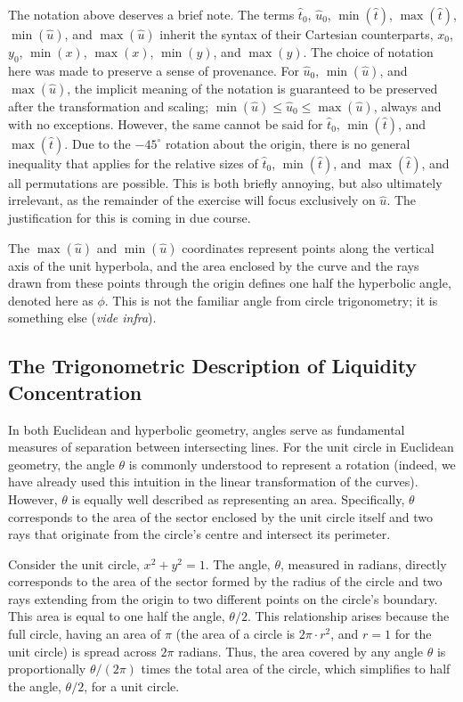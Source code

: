 \documentclass{article}
\begin{document}
The notation above deserves a brief note. The terms ${\hat{t}}_{0}$, ${\hat{u}}_{0}$, $\min(\hat{t})$, $\max(\hat{t})$, $\min(\hat{u})$, and $\max(\hat{u})$ inherit the syntax of their Cartesian counterparts, $x_{0}$, $y_{0}$, $\min(x)$, $\max(x)$, $\min(y)$, and $\max(y)$. The choice of notation here was made to preserve a sense of provenance. For ${\hat{u}}_{0}$, $\min(\hat{u})$, and $\max(\hat{u})$, the implicit meaning of the notation is guaranteed to be preserved after the transformation and scaling; $\min(\hat{u}) \leq {\hat{u}}_{0} \leq \max(\hat{u})$, always and with no exceptions. However, the same cannot be said for ${\hat{t}}_{0}$, $\min(\hat{t})$, and $\max(\hat{t})$. Due to the $-45^\circ$ rotation about the origin, there is no general inequality that applies for the relative sizes of ${\hat{t}}_{0}$, $\min(\hat{t})$, and $\max(\hat{t})$, and all permutations are possible. This is both briefly annoying, but also ultimately irrelevant, as the remainder of the exercise will focus exclusively on $\hat{u}$. The justification for this is coming in due course.

The $\max\left( \hat{u} \right)$ and $\min\left( \hat{u} \right)$ coordinates represent points along the vertical axis of the unit hyperbola, and the area enclosed by the curve and the rays drawn from these points through the origin defines one half the hyperbolic angle, denoted here as $\phi$. This is not the familiar angle from circle trigonometry; it is something else (\textit{vide infra}).

\subsection{The Trigonometric Description of Liquidity Concentration}\label{subsec5.3}

In both Euclidean and hyperbolic geometry, angles serve as fundamental measures of separation between intersecting lines. For the unit circle in Euclidean geometry, the angle $\theta$ is commonly understood to represent a rotation (indeed, we have already used this intuition in the linear transformation of the curves). However, $\theta$ is equally well described as representing an area. Specifically, $\theta$ corresponds to the area of the sector enclosed by the unit circle itself and two rays that originate from the circle's centre and intersect its perimeter.

Consider the unit circle, $x^{2} + y^{2} = 1$. The angle, $\theta$, measured in radians, directly corresponds to the area of the sector formed by the radius of the circle and two rays extending from the origin to two different points on the circle's boundary. This area is equal to one half the angle, $\theta / 2$. This relationship arises because the full circle, having an area of $\pi$ (the area of a circle is $2 \pi \cdot r^{2}$, and $r = 1$ for the unit circle) is spread across $2 \pi$ radians. Thus, the area covered by any angle $\theta$ is proportionally $\theta / \left( 2 \pi \right)$ times the total area of the circle, which simplifies to half the angle, $\theta / 2$, for a unit circle.
\end{document}
